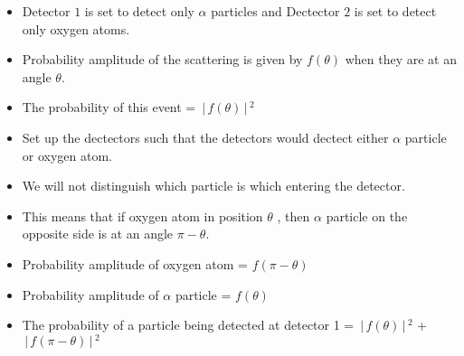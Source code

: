 \documentclass[aspectratio=169]{beamer}
\begin{document}
\begin{frame}{}

	\begin{itemize}
		\item Detector $ 1 $ is set to detect only $ \alpha $ particles and Dectector  $ 2 $ is set to detect only oxygen atoms.\newline
		\item Probability amplitude of the scattering is given by $ f(\theta)$ when they are at an angle $\theta$.\newline
		\item The probability of this event = $ \,\Bigr\rvert\,f(\theta) \,\Bigr\rvert\,^{2} $
	\end{itemize}
		
\end{frame}


\begin{frame}{}

	\begin{itemize}
	
		\item Set up the dectectors such that the detectors would dectect either $\alpha$ particle or oxygen atom.\newline
		\item We will not distinguish which particle is which entering the detector.\newline
		\item This means that if oxygen atom in position $\theta$ , then
		$\alpha$ particle on the opposite side is at an angle $\pi-\theta$.
		
	\end{itemize}
	
\end{frame}

\begin{frame}

	\begin{itemize}
	
		\item Probability amplitude of oxygen atom = $f(\pi-\theta)$ \newline
		\item Probability amplitude of $\alpha$ particle = $f(\theta)$ \newline
		\item The probability of a particle 
		being detected at detector 1 = $ \,\Bigr\rvert\,f(\theta) \,\Bigr\rvert\,^{2} $ + $ \,\Bigr\rvert\,f(\pi - \theta) \,\Bigr\rvert\,^{2} $
		
 	\end{itemize}
 	
\end{frame}
\end{document}
